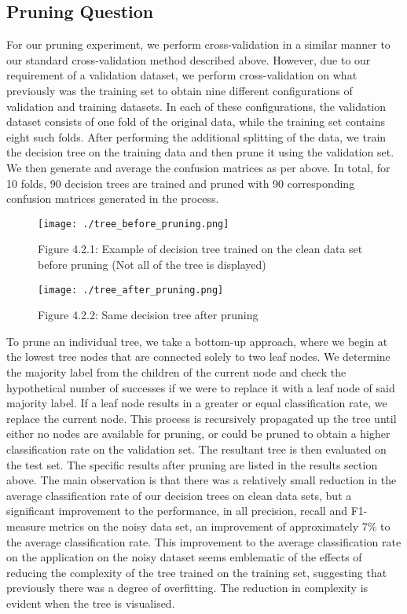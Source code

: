 \documentclass[11pt, a4paper]{article}
\begin{document}
\subsection{\textbf{Pruning Question}}
  \noindent
  For our pruning experiment, we perform cross-validation in a similar manner to
  our standard cross-validation method described above. However, due to our requirement of
  a validation dataset, we perform cross-validation on what previously was the
  training set to obtain nine different configurations of validation and training
  datasets. In each of these configurations, the validation dataset consists of
  one fold of the original data, while the training set contains eight such
  folds. After performing the additional splitting of the data, we train the decision tree
  on the training data and then prune it using the validation set. We then
  generate and average the confusion matrices as per above. In total, for 10
  folds, 90 decision trees are trained and pruned with 90 corresponding
  confusion matrices generated in the process.
  \begin{figure}[h!]
  \centering
  \texttt{[image: ./tree\_before\_pruning.png]}
  \caption*{Figure 4.2.1: Example of decision tree trained on the clean data set before pruning (Not all of the tree is displayed)}
  \end{figure}

  \begin{figure}[h!]
  \centering
  \texttt{[image: ./tree\_after\_pruning.png]}
  \caption*{Figure 4.2.2: Same decision tree after pruning}
  \end{figure}
  \noindent
  To prune an individual tree, we take a bottom-up approach, where we begin at
  the lowest tree nodes that are connected solely to two leaf nodes. We
  determine the majority label from the children of the current node and check
  the hypothetical number of successes if we were to replace it with a leaf node
  of said majority label. If a leaf node results in a greater or equal
  classification rate, we replace the current node. This process is recursively
  propagated up the tree until either no nodes are available for pruning, or
  could be pruned to obtain a higher classification rate on the validation set.
  The resultant tree is then evaluated on the test set.
  \newline\newline\noindent
  The specific results after pruning are listed in the results section above.
  The main observation is that there was a relatively small reduction in the
  average classification rate of our decision trees on clean data sets, but a
  significant improvement to the performance, in all precision, recall and
  F1-measure metrics on the noisy data set, an improvement of approximately 7\%
  to the average classification rate.
  \newline\newline\noindent
  This improvement to the average classification rate on the application on the
  noisy dataset seems emblematic of the effects of reducing the complexity of
  the tree trained on the training set, suggesting that previously there was a
  degree of overfitting. The reduction in complexity is evident when the tree is
  visualised.
\end{document}
